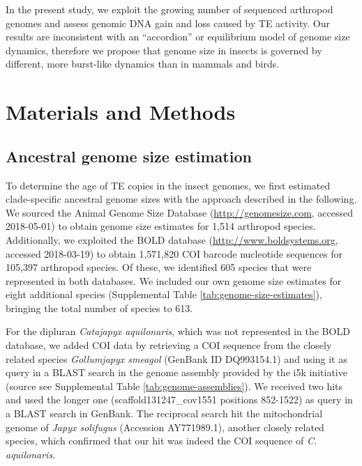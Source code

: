 In the present study, we exploit the growing number of sequenced
arthropod genomes and assess genomic DNA gain and loss caused by TE
activity. Our results are inconsistent with an ``accordion'' or
equilibrium model of genome size dynamics, therefore we propose that
genome size in insects is governed by different, more burst-like
dynamics than in mammals and birds.

\section{Materials and Methods}

\subsection*{Ancestral genome size
estimation}

To determine the age of TE copies in the insect genomes, we first
estimated clade-specific ancestral genome sizes with the approach
described in the following. We sourced the Animal Genome Size Database
\citep{Gregory2018} (\url{http://genomesize.com}, accessed 2018-05-01) to
obtain genome size estimates for 1,514 arthropod species. Additionally,
we exploited the BOLD database \citep{Ratnasingham2007}
(\url{http://www.boldsystems.org}, accessed 2018-03-19) to obtain
1,571,820 COI barcode nucleotide sequences for 105,397 arthropod
species. Of these, we identified 605 species that were represented in
both databases. We included our own genome size estimates for eight
additional species (Supplemental Table \ref{tab:genome-size-estimates}), bringing the total number of
species to 613.

For the dipluran \emph{Catajapyx aquilonaris}, which was not represented
in the BOLD database, we added COI data by retrieving a COI sequence
from the closely related species \emph{Gollumjapyx smeagol} (GenBank ID
DQ993154.1) and using it as query in a BLAST search in the genome
assembly provided by the i5k initiative (source see Supplemental Table
\ref{tab:genome-assemblies}). We received two hits and used the longer one
(scaffold131247\_cov1551 positions 852-1522) as query in a BLAST search
in GenBank. The reciprocal search hit the mitochondrial genome of
\emph{Japyx solifugus} (Accession AY771989.1), another closely related
species, which confirmed that our hit was indeed the COI sequence of
\emph{C. aquilonaris}.

